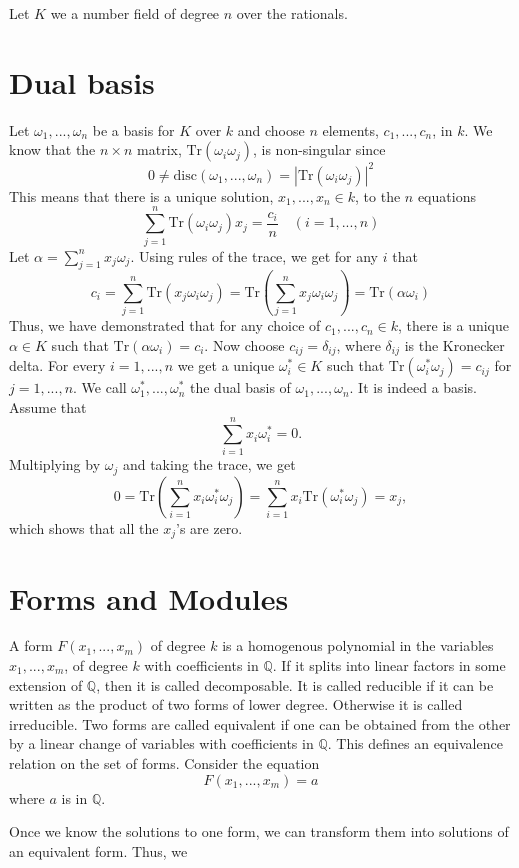 \documentclass{article}
\newcommand{\mbb}[1]{\mathbb{#1}}
\newcommand{\tr}[1]{\text{Tr}(#1)}
\begin{document}
Let $K$ we a number field of degree $n$ over the rationals.


\section*{Dual basis}
Let $\omega_1, ..., \omega_n$ be a basis for $K$ over $k$ and choose $n$ elements, $c_1, ..., c_n$, in $k$. We know that the $n \times n$ matrix, $\tr {\omega_i \omega_j}$, is non-singular since $$0 \neq \text{disc}(\omega_1, ..., \omega_n) = |\tr{\omega_i \omega_j}|^2$$
This means that there is a unique solution, $x_1, ..., x_n \in k$, to the $n$ equations
$$\sum_{j=1}^n \tr{\omega_i \omega_j} x_j = \frac{c_i}{n} \quad (i = 1, ..., n)$$
Let $\alpha = \sum_{j=1}^n x_j \omega_j$. Using rules of the trace, we get for any $i$ that
$$c_i = \sum_{j=1}^n \tr{x_j \omega_i \omega_j} = \tr{\sum_{j=1}^n x_j \omega_i \omega_j} = \tr{\alpha \omega_i}$$
Thus, we have demonstrated that for any choice of $c_1, ..., c_n \in k$, there is a unique $\alpha \in K$ such that $\tr{\alpha \omega_i} = c_i$. Now choose $c_{ij} = \delta_{ij}$, where $\delta_{ij}$ is the Kronecker delta. For every $i = 1, ..., n$ we get a unique $\omega_i^* \in K$ such that $\tr{\omega_i^* \omega_j} = c_{ij}$ for $j = 1, ..., n$. We call $\omega_1^*, ..., \omega_n^*$ the dual basis of $\omega_1, ..., \omega_n$. It is indeed a basis. Assume that 
$$\sum_{i=1}^n x_i \omega_i^* = 0.$$
Multiplying by $\omega_j$ and taking the trace, we get
$$0 = \tr{\sum_{i=1}^n x_i \omega_i^* \omega_j} = \sum_{i=1}^n x_i \tr{\omega_i^* \omega_j} = x_j,$$
which shows that all the $x_j$'s are zero.


\section*{Forms and Modules}
A form $F(x_1, ..., x_m)$ of degree $k$ is a homogenous polynomial in the variables $x_1, ..., x_m$, of degree $k$ with coefficients in $\mbb{Q}$. If it splits into linear factors in some extension of $\mbb{Q}$, then it is called decomposable. It is called reducible if it can be written as the product of two forms of lower degree. Otherwise it is called irreducible. Two forms are called equivalent if one can be obtained from the other by a linear change of variables with coefficients in $\mbb{Q}$. This defines an equivalence relation on the set of forms. Consider the equation 
$$F(x_1, ..., x_m) = a$$
where $a$ is in $\mbb{Q}$. 

Once we know the solutions to one form, we can transform them into solutions of an equivalent form. Thus, we \
\end{document}
